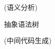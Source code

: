 \begin{frame}{}
  \begin{center}


    \vspace{0.30cm}
     (语义分析)

    \vspace{0.30cm}
    抽象语法树

    \vspace{0.30cm}
     (中间代码生成)
  \end{center}
\end{frame}
